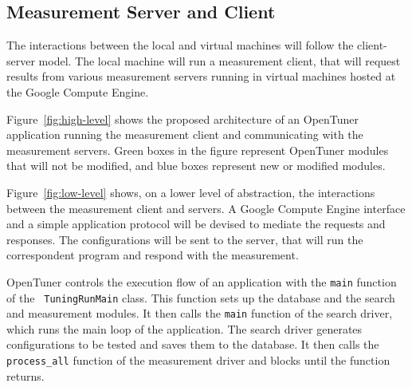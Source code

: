 \documentclass[a4paper, 12pt]{article}
\begin{document}
\subsection{Measurement Server and Client}

The interactions between the local and virtual machines will follow the
client-server model. The local machine will run a measurement client, that will
request results from various measurement servers running in virtual machines
hosted at the Google Compute Engine.


Figure~\ref{fig:high-level} shows the proposed architecture of an OpenTuner
application running the measurement client and communicating with the
measurement servers.  Green boxes in the figure represent OpenTuner modules
that will not be modified, and blue boxes represent new or modified modules.

Figure~\ref{fig:low-level} shows, on a lower level of abstraction, the
interactions between the measurement client and servers. A Google Compute
Engine interface and a simple application protocol will be devised to mediate
the requests and responses.  The configurations will be sent to the server,
that will run the correspondent program and respond with the measurement.

OpenTuner controls the execution flow of an application with the
\texttt{\footnotesize main} function of the \texttt{\footnotesize
TuningRunMain} class. This function sets up the database and the search and
measurement modules. It then calls the \texttt{\footnotesize main}
function of the search driver, which runs the main loop of the application.
The search driver generates configurations to be tested and saves
them to the database. It then calls the \texttt{\footnotesize process\_all}
function of the measurement driver and blocks until the function returns.
\end{document}
